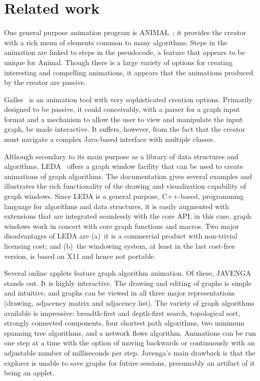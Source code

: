 \section{Related work}\label{sec:related_work}



One general purpose animation program is ANIMAL~\cite{2002-JVLC-Roessling,ANIMAL};
it provides the creator
with a rich menu
of elements common to many algorithms.
Steps in the animation are linked to steps in the pseudocode, a feature that
appears to be unique for Animal.
Though there is a large variety of options for creating interesting and
compelling animations,
it appears that the animations produced by the creator are passive.

Galles~\cite{Galles} is an animation tool with very
sophisticated creation options.
Primarily designed to be passive, it could conceivably, with a parser
for a graph input format and a mechanism to allow the user to view and
manipulate the input graph, be made interactive.
It suffers, however, from the fact that the
creator must navigate a complex Java-based interface with multiple classes.

Although secondary to its main purpose as a library of data structures and
algorithms,
LEDA~\cite{1999-LEDA-Mehlhorn} offers a graph window facility that can be
used to create animations of graph algorithms.
The documentation gives several examples and illustrates the rich functionality of
the drawing and visualization capability of graph windows.
Since LEDA is a general purpose, C++-based, programming language for
algorithms and data structures, it is easily augmented with extensions that
are integrated seamlessly with the core API; in this case, graph windows work
in concert with core graph functions and macros.
Two major disadvantages of LEDA are (a)~it is a commercial product with
non-trivial licensing cost; and (b)~the windowing
system, at least in the last cost-free version, is based on X11 and hence not
portable.

Several online applets feature graph algorithm animation. Of these,
JAVENGA~\cite{JAVENGA} stands out. It is highly interactive. The drawing and
editing of
graphs is simple and intuitive, and graphs can be viewed in all three major
representations (drawing, adjacency matrix and adjacency list).
The variety of graph algorithms available is impressive:
breadth-first and depth-first search, topological sort, strongly connected
components, four shortest path algorithms, two minimum spanning tree
algorithms, and a network flows algorithm.
Animations can be run one step at a time with the option of moving backwards
or continuously with an adjustable number of milliseconds per step.
Javenga's main drawback is that the explorer is unable to save graphs for
future sessions, presumably an artifact of it being an applet.


